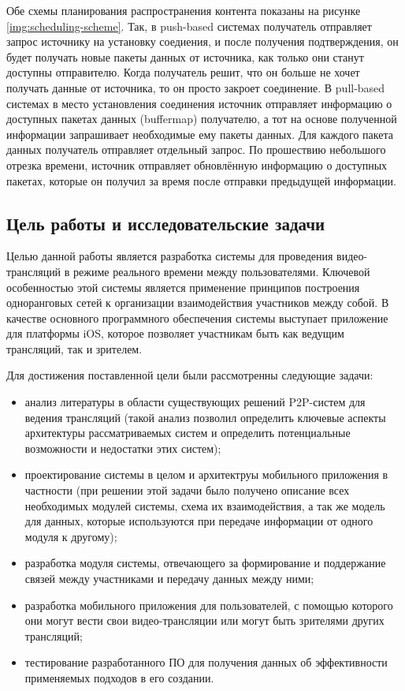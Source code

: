 		Обе схемы планирования распространения контента показаны на рисунке \ref{img:scheduling-scheme}. Так, в
		push-based системах получатель отправляет запрос источнику на установку соедиения, и после получения
		подтверждения, он будет получать новые пакеты данных от источника, как только они станут доступны отправителю.
		Когда получатель решит, что он больше не хочет получать данные от источника, то он просто закроет соединение.
		В pull-based системах в место установления соединения источник отправляет информацию о доступных пакетах данных
		(buffermap) получателю, а тот на основе полученной информации запрашивает необходимые ему пакеты данных. Для
		каждого пакета данных получатель отправляет отдельный запрос. По прошествию небольшого отрезка времени,
		источник отправляет обновлённую информацию о доступных пакетах, которые он получил за время после отправки
		предыдущей информации.


	\subsection{Цель работы и исследовательские задачи}
	Целью данной работы является разработка системы для проведения видео-трансляций в режиме реального времени между
	пользователями. Ключевой особенностью этой системы является применение принципов построения одноранговых сетей к
	организации взаимодействия участников между собой. В качестве основного программного обеспечения системы выступает
	приложение для платформы iOS, которое позволяет участникам быть как ведущим трансляций, так и зрителем.

	Для достижения поставленной цели были рассмотренны следующие задачи:
	\begin{itemize}
		\item анализ литературы в области существующих решений P2P-систем для ведения трансляций (такой анализ позволил
		определить ключевые аспекты архитектуры рассматриваемых систем и определить потенциальные возможности и
		недостатки этих систем);
		\item проектирование системы в целом и архитектруы мобильного приложения в частности (при решении этой задачи
		было получено описание всех необходимых модулей системы, схема их взаимодействия, а так же модель для данных,
		которые используются при передаче информации от одного модуля к другому);
		\item разработка модуля системы, отвечающего за формирование и поддержание связей между участниками и передачу
		данных между ними;
		\item разработка мобильного приложения для пользователей, с помощью которого они могут вести свои
		видео-трансляции или могут быть зрителями других трансляций;
		\item тестирование разработанного ПО для получения данных об эффективности применяемых подходов в его создании.
	\end{itemize}


